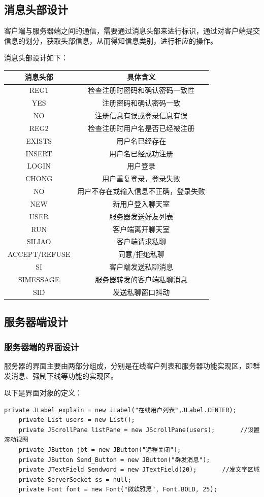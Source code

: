 \documentclass[UTF8,12pt]{article}
\begin{document}
\subsection{消息头部设计}
客户端与服务器端之间的通信，需要通过消息头部来进行标识，通过对客户端提交信息的划分，获取头部信息，从而得知信息类别，进行相应的操作。

消息头部设计如下：

\begin{tabular}{cc}
    \toprule
    消息头部 & 具体含义 \\
    \midrule
    REG1&检查注册时密码和确认密码一致性\\
    YES&注册密码和确认密码一致\\
    NO&注册信息有误或登录信息有误\\
    REG2&检查注册时用户名是否已经被注册\\
    EXISTS&用户名已经存在\\
    INSERT&用户名已经成功注册\\
    LOGIN&用户登录\\
    CHONG&用户重复登录，登录失败\\
    NO&用户不存在或输入信息不正确，登录失败\\
    NEW&新用户登入聊天室\\
    USER&服务器发送好友列表\\
    RUN&客户端离开聊天室\\
    SILIAO&客户端请求私聊\\
    ACCEPT/REFUSE&同意/拒绝私聊\\
    SI&客户端发送私聊消息\\
    SIMESSAGE&服务器转发的客户端私聊消息\\
    SID&发送私聊窗口抖动\\
    \bottomrule
\end{tabular}

\subsection{服务器端设计}
\subsubsection{服务器端的界面设计}
服务器的界面主要由两部分组成，分别是在线客户列表和服务器功能实现区，即群发消息、强制下线等功能的实现区。

以下是界面对象的定义：
\begin{lstlisting}[title=界面对象的定义,frame=shadowbox]
    private JLabel explain = new JLabel("在线用户列表",JLabel.CENTER);
    private List users = new List();
    private JScrollPane listPane = new JScrollPane(users);       //设置滚动视图
    private JButton jbt = new JButton("远程关闭");
    private JButton Send_Button = new JButton("群发消息");
    private JTextField Sendword = new JTextField(20);       //发文字区域
    private ServerSocket ss = null;
    private Font font = new Font("微软雅黑", Font.BOLD, 25);
\end{lstlisting}
\end{document}
